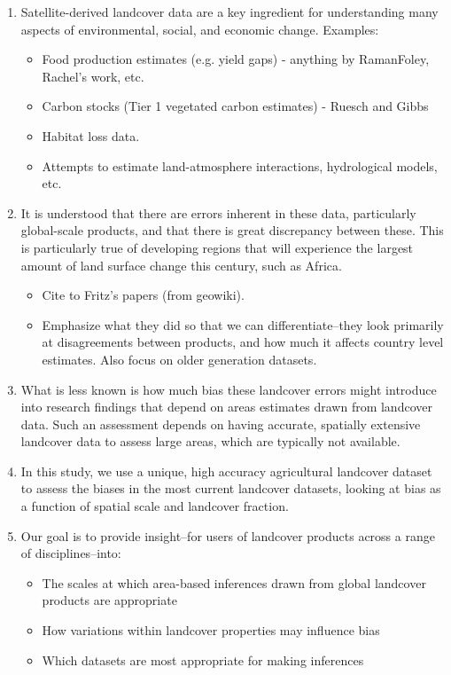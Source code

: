 \documentclass[11 pt]{article}
\begin{document}
\begin{enumerate}
  \item Satellite-derived landcover data are a key ingredient for understanding many aspects of environmental, social, and economic change. Examples:
    \begin{itemize}
      \item Food production estimates (e.g. yield gaps) - anything by RamanFoley, Rachel's work, etc.
      \item Carbon stocks (Tier 1 vegetated carbon estimates) - Ruesch and Gibbs
      \item Habitat loss data.
      \item Attempts to estimate land-atmosphere interactions, hydrological models, etc. 
    \end{itemize}
  \item It is understood that there are errors inherent in these data, particularly global-scale products, and that there is great discrepancy between these. This is particularly true of developing regions that will experience the largest amount of land surface change this century, such as Africa.  
    \begin{itemize} 
      \item Cite to Fritz's papers (from geowiki). 
      \item Emphasize what they did so that we can differentiate--they look primarily at disagreements between products, and how much it affects country level estimates. Also focus on older generation datasets. 
    \end{itemize}
  \item What is less known is how much bias these landcover errors might introduce into research findings that depend on areas estimates drawn from landcover data. Such an assessment depends on having accurate, spatially extensive landcover data to assess large areas, which are typically not available. 
  \item In this study, we use a unique, high accuracy agricultural landcover dataset to assess the biases in the most current landcover datasets, looking at bias as a function of spatial scale and landcover fraction.  
  \item Our goal is to provide insight--for users of landcover products across a range of disciplines--into: 
    \begin{itemize}
      \item The scales at which area-based inferences drawn from global landcover products are appropriate
      \item How variations within landcover properties may influence bias
      \item Which datasets are most appropriate for making inferences
    \end{itemize}
\end{enumerate}
\end{document}
